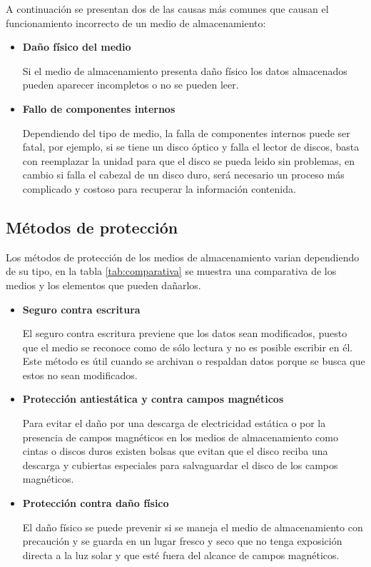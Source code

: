 A continuaci\'{o}n se presentan dos de las causas m\'{a}s comunes que causan el funcionamiento incorrecto de un medio de almacenamiento:

    \begin{itemize}

      \item \textbf{Da\~{n}o f\'{i}sico del medio}

Si el medio de almacenamiento presenta da\~{n}o f\'{i}sico los datos almacenados pueden aparecer incompletos o no se pueden leer.

      \item \textbf{Fallo de componentes internos}

Dependiendo del tipo de medio, la falla de componentes internos puede ser fatal, por ejemplo, si se tiene un disco \'{o}ptico y falla el lector de discos, basta con reemplazar la unidad para que el disco se pueda leido sin problemas, en cambio si falla el cabezal de un disco duro, ser\'{a} necesario un proceso m\'{a}s complicado y costoso para recuperar la informaci\'{o}n contenida.

    \end{itemize}

  \subsection {M\'{e}todos de protecci\'{o}n}

Los m\'{e}todos de protecci\'{o}n de los medios de almacenamiento varian dependiendo de su tipo, en la tabla \ref{tab:comparativa} se muestra una comparativa de los medios y los elementos que pueden da\~{n}arlos.

    \begin{itemize}

      \item \textbf{Seguro contra escritura}

El seguro contra escritura previene que los datos sean modificados, puesto que el medio se reconoce como de s\'{o}lo lectura y no es posible escribir en \'{e}l. Este m\'{e}todo es \'{u}til cuando se archivan o respaldan datos porque se busca que estos no sean modificados.

      \item \textbf{Protecci\'{o}n antiest\'{a}tica y contra campos magn\'{e}ticos}

Para evitar el da\~{n}o por una descarga de electricidad est\'{a}tica o por la presencia de campos magn\'{e}ticos en los medios de almacenamiento como cintas o discos duros existen bolsas que evitan que el disco reciba una descarga y cubiertas especiales para salvaguardar el disco de los campos magn\'{e}ticos.

      \item \textbf{Protecci\'{o}n contra da\~{n}o f\'{i}sico}

El da\~{n}o f\'{i}sico se puede prevenir si se maneja el medio de almacenamiento con precauci\'{o}n y se guarda en un lugar fresco y seco que no tenga exposici\'{o}n directa a la luz solar y que est\'{e} fuera del alcance de campos magn\'{e}ticos.

    \end{itemize}


